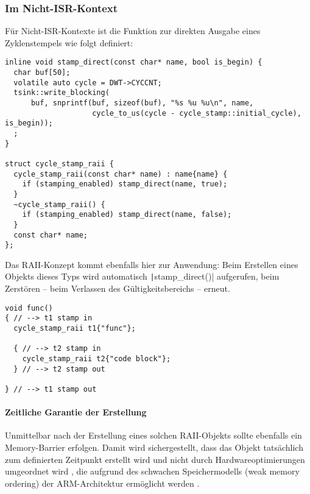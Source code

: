 \subsubsection{Im Nicht-ISR-Kontext}

Für Nicht-ISR-Kontexte ist die Funktion zur direkten Ausgabe eines
Zyklenstempels wie folgt definiert:

\begin{code}
\begin{verbatim}
inline void stamp_direct(const char* name, bool is_begin) {
  char buf[50];
  volatile auto cycle = DWT->CYCCNT;
  tsink::write_blocking(
      buf, snprintf(buf, sizeof(buf), "%s %u %u\n", name,
                    cycle_to_us(cycle - cycle_stamp::initial_cycle), is_begin));
  ;
}

struct cycle_stamp_raii {
  cycle_stamp_raii(const char* name) : name{name} {
    if (stamping_enabled) stamp_direct(name, true);
  }
  ~cycle_stamp_raii() {
    if (stamping_enabled) stamp_direct(name, false);
  }
  const char* name;
};
\end{verbatim}
\end{code}

Das RAII-Konzept kommt ebenfalls hier zur Anwendung: Beim Erstellen eines
Objekts dieses Typs wird automatisch \texttt|stamp_direct()|
aufgerufen, beim Zerstören -- beim Verlassen des Gültigkeitsbereichs -- erneut.

\begin{code}
\begin{verbatim}
void func()
{ // --> t1 stamp in
  cycle_stamp_raii t1{"func"};

  { // --> t2 stamp in
    cycle_stamp_raii t2{"code block"};
  } // --> t2 stamp out

} // --> t1 stamp out
\end{verbatim}
\end{code}

\paragraph{Zeitliche Garantie der Erstellung}

Unmittelbar nach der Erstellung eines solchen RAII-Objekts sollte ebenfalls ein
Memory-Barrier erfolgen. Damit wird sichergestellt, dass das Objekt tatsächlich
zum definierten Zeitpunkt erstellt wird und nicht durch Hardwareoptimierungen
umgeordnet wird \cite{wikipedia_membarrier}, die aufgrund des schwachen
Speichermodells (weak memory ordering) der ARM-Architektur ermöglicht werden
\cite[S. 5]{arm_sync_overview}.

